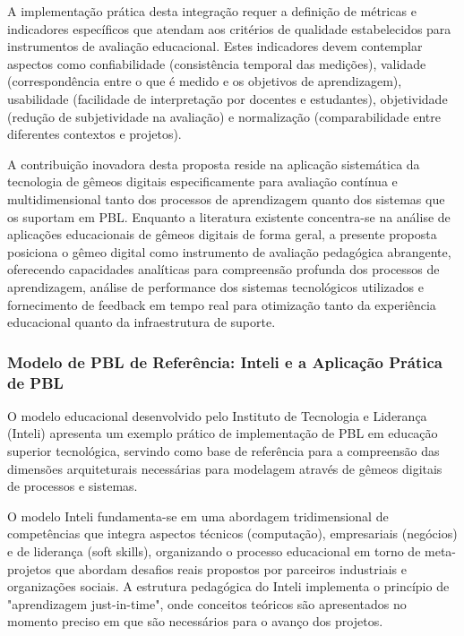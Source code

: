 \documentclass[12pt, a4paper, oneside]{abntex2}
\begin{document}
A implementação prática desta integração requer a definição de métricas e indicadores específicos que atendam aos critérios de qualidade estabelecidos para instrumentos de avaliação educacional. Estes indicadores devem contemplar aspectos como confiabilidade (consistência temporal das medições), validade (correspondência entre o que é medido e os objetivos de aprendizagem), usabilidade (facilidade de interpretação por docentes e estudantes), objetividade (redução de subjetividade na avaliação) e normalização (comparabilidade entre diferentes contextos e projetos).

A contribuição inovadora desta proposta reside na aplicação sistemática da tecnologia de gêmeos digitais especificamente para avaliação contínua e multidimensional tanto dos processos de aprendizagem quanto dos sistemas que os suportam em PBL. Enquanto a literatura existente \cite{bachmann2023} concentra-se na análise de aplicações educacionais de gêmeos digitais de forma geral, a presente proposta posiciona o gêmeo digital como instrumento de avaliação pedagógica abrangente, oferecendo capacidades analíticas para compreensão profunda dos processos de aprendizagem, análise de performance dos sistemas tecnológicos utilizados e fornecimento de feedback em tempo real para otimização tanto da experiência educacional quanto da infraestrutura de suporte.

\subsubsection{Modelo de PBL de Referência: Inteli e a Aplicação Prática de PBL}

O modelo educacional desenvolvido pelo Instituto de Tecnologia e Liderança (Inteli) \cite{inteli2024} apresenta um exemplo prático de implementação de PBL em educação superior tecnológica, servindo como base de referência para a compreensão das dimensões arquiteturais necessárias para modelagem através de gêmeos digitais de processos e sistemas.

O modelo Inteli fundamenta-se em uma abordagem tridimensional de competências que integra aspectos técnicos (computação), empresariais (negócios) e de liderança (soft skills), organizando o processo educacional em torno de meta-projetos que abordam desafios reais propostos por parceiros industriais e organizações sociais. A estrutura pedagógica do Inteli implementa o princípio de "aprendizagem just-in-time", onde conceitos teóricos são apresentados no momento preciso em que são necessários para o avanço dos projetos.
\end{document}
